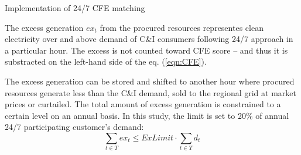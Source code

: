 \begin{frame}{Implementation of 24/7 CFE matching}

  {\small

  The excess generation $ex_t$ from the procured resources representes clean electricity over
  and above demand of C\&I consumers following 24/7 approach in a particular hour. 
  The \alert{excess is not counted toward CFE score} -- 
  and thus it is substracted on the left-hand side of the eq. (\ref{eqn:CFE}).

  The excess generation can be stored and shifted to another hour where procured resources 
  generate less than the C\&I demand, sold to the regional grid at market prices or curtailed. 
  The total amount of excess generation is constrained to a certain level on an annual basis. 
  In this study, the limit is set to 20\% of annual 24/7 participating customer's demand:
  \vspace{0.1cm}
  \begin{equation}
  \sum_{t\in T} ex_t \leq ExLimit \cdot \sum_{t\in T} d_t
  \label{eqn:excess}
  \end{equation}

  \noindent{}
  }

\end{frame}



